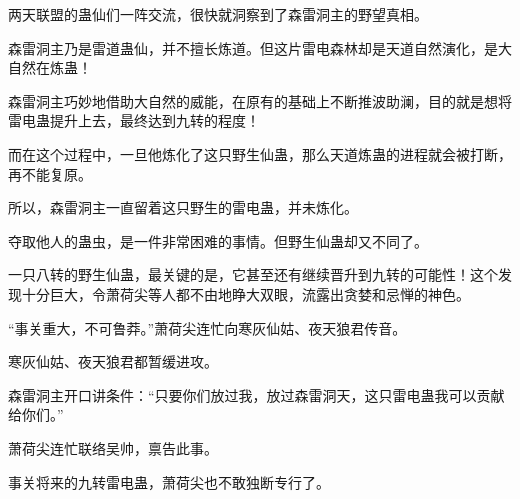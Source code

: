 \begin{this_body}
两天联盟的蛊仙们一阵交流，很快就洞察到了森雷洞主的野望真相。

森雷洞主乃是雷道蛊仙，并不擅长炼道。但这片雷电森林却是天道自然演化，是大自然在炼蛊！

森雷洞主巧妙地借助大自然的威能，在原有的基础上不断推波助澜，目的就是想将雷电蛊提升上去，最终达到九转的程度！

而在这个过程中，一旦他炼化了这只野生仙蛊，那么天道炼蛊的进程就会被打断，再不能复原。

所以，森雷洞主一直留着这只野生的雷电蛊，并未炼化。

夺取他人的蛊虫，是一件非常困难的事情。但野生仙蛊却又不同了。

一只八转的野生仙蛊，最关键的是，它甚至还有继续晋升到九转的可能性！这个发现十分巨大，令萧荷尖等人都不由地睁大双眼，流露出贪婪和忌惮的神色。

“事关重大，不可鲁莽。”萧荷尖连忙向寒灰仙姑、夜天狼君传音。

寒灰仙姑、夜天狼君都暂缓进攻。

森雷洞主开口讲条件：“只要你们放过我，放过森雷洞天，这只雷电蛊我可以贡献给你们。”

萧荷尖连忙联络吴帅，禀告此事。

事关将来的九转雷电蛊，萧荷尖也不敢独断专行了。

\end{this_body}

